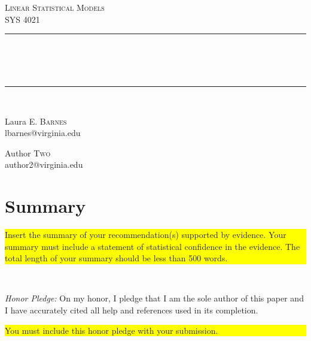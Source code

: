\documentclass{article}
\newcommand{\HRule}{\rule{\linewidth}{0.5mm}}
\begin{document}
\begin{titlepage}

\begin{center}

	\textsc{\LARGE Linear Statistical Models}\\[1cm]
	\textsc{\Large SYS 4021}\\[0.5cm]

\HRule \\[0.4cm]
\\[0.5cm]
\\[0.5cm]
\HRule \\[1.5cm]

	\begin{minipage}{0.4\textwidth}
	\begin{center} \large
	Laura E. \textsc{Barnes}\\
	lbarnes@virginia.edu
	\end{center}
	\end{minipage}
		\begin{minipage}{0.4\textwidth}
	\begin{center} \large
	Author \textsc{Two}\\
	author2@virginia.edu
	\end{center}
	\end{minipage}
		\vspace{1.5cm}


\section*{Summary}\label{section:summary}

\colorbox{yellow}{\parbox{5 in}{Insert the summary of your recommendation(s) supported by evidence. Your summary must include a statement of statistical confidence in the evidence. The total length of your summary should be less than 500 words.}}\\[0.5cm]

{\parbox{5 in}{\textit{Honor Pledge:} On my honor, I pledge that I am the sole author of this paper and I have accurately cited all help and references used in its completion.}}

\colorbox{yellow}{\parbox{5 in}{You must include this honor pledge with your submission.}}

\vfill


\end{center}

\end{titlepage}
\end{document}
